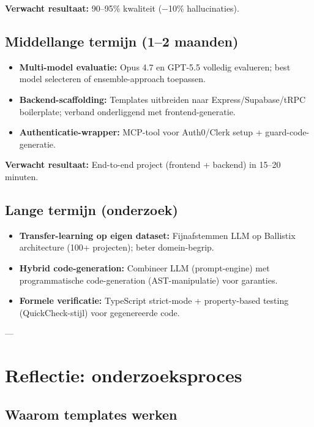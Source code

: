 \noindent
\textbf{Verwacht resultaat:} 90–95\% kwaliteit (−10\% hallucinaties).

\subsection{Middellange termijn (1–2 maanden)}

\begin{itemize}
  \item \textbf{Multi-model evaluatie:} Opus 4.7 en GPT-5.5 volledig evalueren; best model selecteren of ensemble-approach toepassen.
  
  \item \textbf{Backend-scaffolding:} Templates uitbreiden naar Express/Supabase/tRPC boilerplate; verband onderliggend met frontend-generatie.
  
  \item \textbf{Authenticatie-wrapper:} MCP-tool voor Auth0/Clerk setup + guard-code-generatie.
\end{itemize}

\noindent
\textbf{Verwacht resultaat:} End-to-end project (frontend + backend) in 15–20 minuten.

\subsection{Lange termijn (onderzoek)}

\begin{itemize}
  \item \textbf{Transfer-learning op eigen dataset:} Fijnafstemmen LLM op Ballistix architecture (100+ projecten); beter domein-begrip.
  
  \item \textbf{Hybrid code-generation:} Combineer LLM (prompt-engine) met programmatische code-generation (AST-manipulatie) voor garanties.
  
  \item \textbf{Formele verificatie:} TypeScript strict-mode + property-based testing (QuickCheck-stijl) voor gegenereerde code.
\end{itemize}

---

\section{Reflectie: onderzoeksproces}

\subsection{Waarom templates werken}

